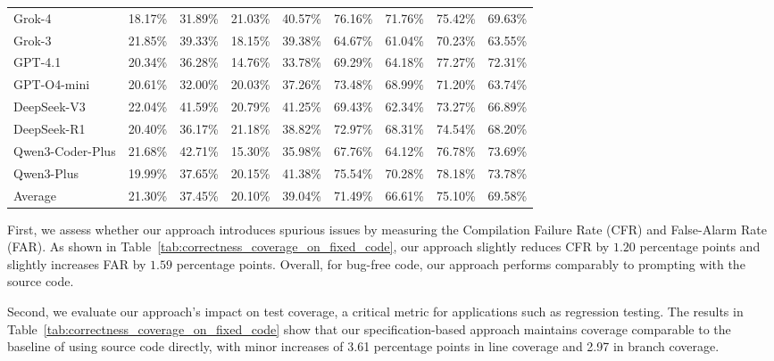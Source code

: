 \documentclass[acmsmall]{acmart}
\begin{document}
\begin{table}[ht]
\begin{tabular}{l|cc|cc|cc|cc}
Grok-4 & 18.17\% & 31.89\% & 21.03\% & 40.57\% & 76.16\% & 71.76\% & 75.42\% & 69.63\% \\
Grok-3 & 21.85\% & 39.33\% & 18.15\% & 39.38\% & 64.67\% & 61.04\% & 70.23\% & 63.55\% \\
GPT-4.1 & 20.34\% & 36.28\% & 14.76\% & 33.78\% & 69.29\% & 64.18\% & 77.27\% & 72.31\% \\
GPT-O4-mini & 20.61\% & 32.00\% & 20.03\% & 37.26\% & 73.48\% & 68.99\% & 71.20\% & 63.74\% \\
DeepSeek-V3 & 22.04\% & 41.59\% & 20.79\% & 41.25\% & 69.43\% & 62.34\% & 73.27\% & 66.89\% \\
DeepSeek-R1 & 20.40\% & 36.17\% & 21.18\% & 38.82\% & 72.97\% & 68.31\% & 74.54\% & 68.20\% \\
Qwen3-Coder-Plus & 21.68\% & 42.71\% & 15.30\% & 35.98\% & 67.76\% & 64.12\% & 76.78\% & 73.69\% \\
Qwen3-Plus & 19.99\% & 37.65\% & 20.15\% & 41.38\% & 75.54\% & 70.28\% & 78.18\% & 73.78\% \\
\midrule
Average & 21.30\% & 37.45\% & 20.10\% & 39.04\% & 71.49\% & 66.61\% & 75.10\% & 69.58\% \\
\bottomrule
\end{tabular}
\vspace{-1.0em}
\end{table}


First, we assess whether our approach introduces spurious issues by measuring the Compilation Failure Rate (CFR) and False-Alarm Rate (FAR). As shown in Table~\ref{tab:correctness_coverage_on_fixed_code}, our approach slightly reduces CFR by $1.20$ percentage points and slightly increases FAR by $1.59$ percentage points. Overall, for bug-free code, our approach performs comparably to prompting with the source code.

Second, we evaluate our approach's impact on test coverage, a critical metric for applications such as regression testing. The results in Table~\ref{tab:correctness_coverage_on_fixed_code} show that our specification-based approach maintains coverage comparable to the baseline of using source code directly, with minor increases of 3.61 percentage points in line coverage and 2.97 in branch coverage.
\end{document}
